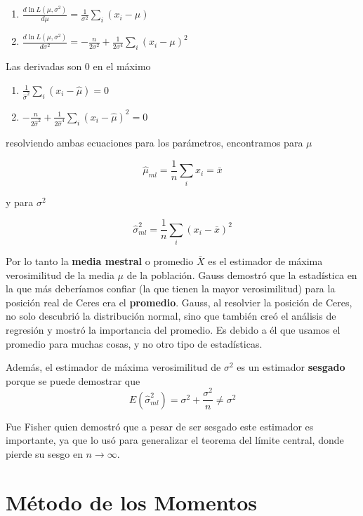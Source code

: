 \documentclass[
]{book}
\providecommand{\tightlist}{%
  \setlength{\itemsep}{0pt}\setlength{\parskip}{0pt}}
\begin{document}
\begin{enumerate}
\def\labelenumi{\alph{enumi})}
\item
  \(\frac{d \ln L(\mu, \sigma^2)}{d\mu}=\frac{1}{\sigma^2} \sum_i(x_i-\mu)\)
\item
  \(\frac{d \ln L(\mu, \sigma^2)}{d\sigma^2}=-\frac{n}{2 \sigma^2}+\frac{1}{2\sigma^4} \sum_i(x_i-\mu)^2\)
\end{enumerate}

Las derivadas son \(0\) en el máximo

\begin{enumerate}
\def\labelenumi{\alph{enumi})}
\tightlist
\item
  \(\frac{1}{\hat{\sigma}^2} \sum_i(x_i-\hat{\mu})=0\)
\item
  \(-\frac{n}{2 \hat{\sigma}^2}+\frac{1}{2\hat{\sigma}^4} \sum_i(x_i-\hat{\mu})^ 2=0\)
\end{enumerate}

resolviendo ambas ecuaciones para los parámetros, encontramos para \(\mu\)

\[\hat{\mu}_{ml}=\frac{1}{n}\sum_i x_i=\bar{x}\]

y para \(\sigma^2\)

\[\hat{\sigma}^2_{ml}=\frac{1}{n}\sum_i(x_i-\bar{x})^2\]

Por lo tanto la \textbf{media mestral} o promedio \(\bar{X}\) es el estimador de máxima verosimilitud de la media \(\mu\) de la población. Gauss demostró que la estadística en la que más deberíamos confiar (la que tienen la mayor verosimilitud) para la posición real de Ceres era el \textbf{promedio}. Gauss, al resolvier la posición de Ceres, no solo descubrió la distribución normal, sino que también creó el análisis de regresión y mostró la importancia del promedio. Es debido a él que usamos el promedio para muchas cosas, y no otro tipo de estadísticas.

Además, el estimador de máxima verosimilitud de \(\sigma^2\) es un estimador \textbf{sesgado} porque se puede demostrar que \[E(\hat{\sigma}^2_{ml})=\sigma^2+ \frac{\sigma^2}{n}\neq\sigma^2\]

Fue Fisher quien demostró que a pesar de ser sesgado este estimador es importante, ya que lo usó para generalizar el teorema del límite central, donde pierde su sesgo en \(n\rightarrow \infty\).

\hypertarget{muxe9todo-de-los-momentos}{%
\section{Método de los Momentos}\label{muxe9todo-de-los-momentos}}
\end{document}
